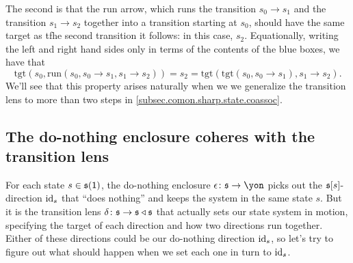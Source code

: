 \documentclass[Book-Poly]{subfiles}
\begin{document}
The second is that the run arrow, which runs the transition $s_0\to s_1$ and the transition $s_1\to s_2$ together into a transition starting at $s_0$, should have the same target as tfhe second transition it follows: in this case, $s_2$.
Equationally, writing the left and right hand sides only in terms of the contents of the blue boxes, we have that
\begin{equation} \label{eqn.state_run_tgt}
    \text{tgt}(s_0,\text{run}(s_0,s_0\to s_1,s_1\to s_2))=s_2=\text{tgt}(\text{tgt}(s_0,s_0\to s_1),s_1\to s_2).
\end{equation}
We'll see that this property arises naturally when we we generalize the transition lens to more than two steps in \cref{subsec.comon.sharp.state.coassoc}.

\subsection{The do-nothing enclosure coheres with the transition lens}\label{subsec.comon.sharp.state.cohere}

For each state $s\in\mathfrak{s}(\textsf{1})$, the do-nothing enclosure $\epsilon\colon\ema{s}\to\yon$ picks out the $\mathfrak{s}[s]$-direction $\mathrm{id}_s$ that ``does nothing'' and keeps the system in the same state $s$.
But it is the transition lens $\delta\colon\mathfrak{s}\to\mathfrak{s}\mathbin{\triangleleft}\mathfrak{s}$ that actually sets our state system in motion, specifying the target of each direction and how two directions run together.
Either of these directions could be our do-nothing direction $\mathrm{id}_s$, so let's try to figure out what should happen when we set each one in turn to $\mathrm{id}_s$.
\end{document}
